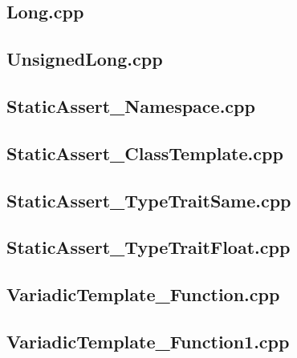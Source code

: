 \documentclass[11pt]{report}
\begin{document}
\begin{appendix}
\subsection{Long.cpp}
\label{Long}


\subsection{UnsignedLong.cpp}
\label{UnsignedLong}


\subsection{StaticAssert\_Namespace.cpp}
\label{StaticAssert_Namespace}


\subsection{StaticAssert\_ClassTemplate.cpp}
\label{StaticAssert_ClassTemplate}


\subsection{StaticAssert\_TypeTraitSame.cpp}
\label{StaticAssert_TypeTraitSame}


\subsection{StaticAssert\_TypeTraitFloat.cpp}
\label{StaticAssert_TypeTraitFloat}


\subsection{VariadicTemplate\_Function.cpp}
\label{VariadicTemplate_Function}


\subsection{VariadicTemplate\_Function1.cpp}
\label{VariadicTemplate_Function1}



\end{appendix}
\end{document}
